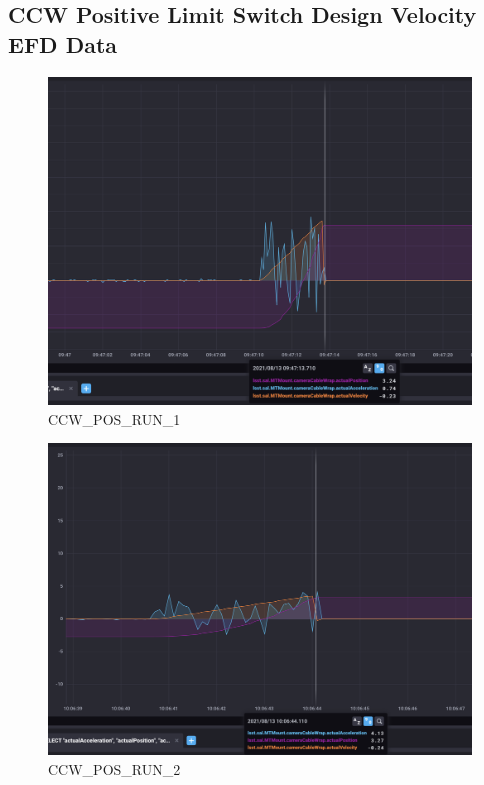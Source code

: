 \documentclass[SE,lsstdraft,authoryear,toc]{lsstdoc}
\begin{document}
\subsection{CCW Positive Limit Switch Design Velocity EFD Data}
\begin{figure}
  \includegraphics[width=\linewidth]{media/ccw_pos_1.png}
  \caption{CCW\_POS\_RUN\_1}
  \label{fig:CCW_POS_RUN_1}
\end{figure}
\newpage
\begin{figure}
  \includegraphics[width=\linewidth]{media/ccw_pos_2.png}
  \caption{CCW\_POS\_RUN\_2}
  \label{fig:CCW_POS_RUN_2}
\end{figure}
\newpage
\end{document}
